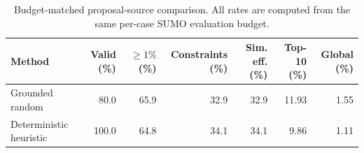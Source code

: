\begin{table}[!ht]
    \caption{Budget-matched proposal-source comparison. All rates are computed from the same per-case SUMO evaluation budget.}
    \label{tab:proposal-source-comparison}
    \begin{center}
    \begin{tabular}{lrrrrrr}
        \hline
        Method & Valid (\%) & $\geq1\%$ (\%) & Constraints (\%) & Sim. eff. (\%) & Top-10 (\%) & Global (\%) \\
        \hline
        Grounded random & 80.0 & 65.9 & 32.9 & 32.9 & 11.93 & 1.55 \\
        Deterministic heuristic & 100.0 & 64.8 & 34.1 & 34.1 & 9.86 & 1.11 \\
        \hline
    \end{tabular}
    \end{center}
\end{table}
